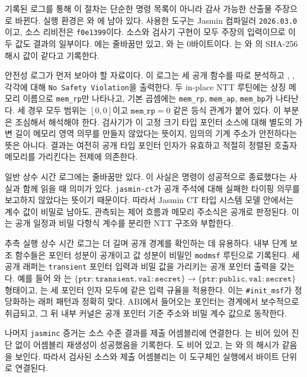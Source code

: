 \documentclass[10pt,twocolumn]{article}
\newcommand{\jasmin}{Jasmin}
\newcommand{\ct}{상수 시간}
\newcommand{\sct}{추측 실행 상수 시간}
\begin{document}
기록된 로그를 통해 이 절차는 단순한 명령 목록이 아니라 감사 가능한
산출물 주장으로 바뀐다. 실행 환경은 와
에 남아 있다. 사용한 도구는 \jasmin{} 컴파일러
\texttt{2026.03.0}이고, 소스 리비전은 \texttt{f0e1399}이다. 소스와 검사기
구현이 모두 주장의 입력이므로 이 두 값도 결과의 일부이다.
에는 줄바꿈만 있고, 와
는 0바이트이다. 는
와 의 SHA-256 해시 값이 같다고
기록한다.

안전성 로그가 먼저 보아야 할 자료이다. 이 로그는 세 공개 함수를 따로
분석하고 , ,
 각각에 대해 \texttt{No Safety Violation}을 출력한다.
두 in-place NTT 루틴에는 상징 메모리 이름으로 \texttt{mem\_rp}만 나타나고,
기본 곱셈에는 \texttt{mem\_rp}, \texttt{mem\_ap}, \texttt{mem\_bp}가
나타난다. 세 경우 모두 범위는 \([0,0]\)이고 \(\texttt{mem\_rp}=0\) 같은
등식 관계가 붙어 있다. 이 부분은 조심해서 해석해야 한다. 검사기가 이
고정 크기 타입 포인터 소스에 대해 별도의 가변 길이 메모리 영역 의무를
만들지 않았다는 뜻이지, 임의의 기계 주소가 안전하다는 뜻은 아니다. 결과는
여전히 공개 타입 포인터 인자가 유효하고 적절히 정렬된 호출자 메모리를
가리킨다는 전제에 의존한다.

일반 \ct{} 로그에는 줄바꿈만 있다. 이 사실은 명령이 성공적으로 종료했다는
사실과 함께 읽을 때 의미가 있다. \texttt{jasmin-ct}가 공개 주석에 대해
실패한 타이핑 의무를 보고하지 않았다는 뜻이기 때문이다. 따라서 \jasmin{}
CT 타입 시스템 모델 안에서는 계수 값이 비밀로 남아도, 관측되는 제어
흐름과 메모리 주소식은 공개로 판정된다. 이는 공개 일정과 비밀 다항식
계수를 분리한 NTT 구조와 부합한다.

\sct{} 로그는 더 길며 공개 경계를 확인하는 데 유용하다. 내부 단계 보조
함수들은 포인터 성분이 공개이고 값 성분이 비밀인 \texttt{modmsf} 루틴으로
기록된다. 세 공개 래퍼는 \texttt{transient} 포인터 입력과 비밀 값을 가리키는 공개
포인터 출력을 갖는다. 예를 들어 와
는
\(\{\texttt{ptr}:\texttt{transient},\texttt{val}:\texttt{secret}\}\to
\{\texttt{ptr}:\texttt{public},\texttt{val}:\texttt{secret}\}\) 형태이고,
는 세 포인터 인자 모두에 같은 입력 규율을 적용한다.
이는 \texttt{\#init\_msf}가 정당화하는 래퍼 패턴과 정확히 맞다. ABI에서
들어오는 포인터는 경계에서 보수적으로 취급되고, 그 뒤 내부 커널은 공개
포인터 기준 주소와 비밀 계수 값으로 동작한다.

나머지 \texttt{jasminc} 증거는 소스 수준 결과를 제출 어셈블리에 연결한다.
는 비어 있어 진단 없이 어셈블리 재생성이
성공했음을 기록한다. 도 비어 있고,
는 와 의
해시가 같음을 보인다. 따라서 검사된 소스와 제출 어셈블리는 이 도구체인
실행에서 바이트 단위로 연결된다.
\end{document}

